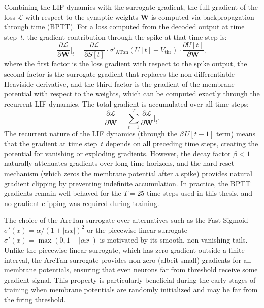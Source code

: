 Combining the LIF dynamics with the surrogate gradient, the full gradient of the loss $\mathcal{L}$ with respect to the synaptic weights $\mathbf{W}$ is computed via backpropagation through time (BPTT). For a loss computed from the decoded output at time step~$t$, the gradient contribution through the spike at that time step is:
\begin{equation}
\frac{\partial \mathcal{L}}{\partial \mathbf{W}} \bigg|_t = \frac{\partial \mathcal{L}}{\partial S[t]} \cdot \sigma'_{\text{ATan}}(U[t] - V_{\text{thr}}) \cdot \frac{\partial U[t]}{\partial \mathbf{W}},
\label{eq:bptt-gradient}
\end{equation}
where the first factor is the loss gradient with respect to the spike output, the second factor is the surrogate gradient that replaces the non-differentiable Heaviside derivative, and the third factor is the gradient of the membrane potential with respect to the weights, which can be computed exactly through the recurrent LIF dynamics. The total gradient is accumulated over all time steps:
\begin{equation}
\frac{\partial \mathcal{L}}{\partial \mathbf{W}} = \sum_{t=1}^{T} \frac{\partial \mathcal{L}}{\partial \mathbf{W}} \bigg|_t.
\label{eq:bptt-total}
\end{equation}
The recurrent nature of the LIF dynamics (through the $\beta \, U[t-1]$ term) means that the gradient at time step~$t$ depends on all preceding time steps, creating the potential for vanishing or exploding gradients. However, the decay factor $\beta < 1$ naturally attenuates gradients over long time horizons, and the hard reset mechanism (which zeros the membrane potential after a spike) provides natural gradient clipping by preventing indefinite accumulation. In practice, the BPTT gradients remain well-behaved for the $T = 25$ time steps used in this thesis, and no gradient clipping was required during training.

The choice of the ArcTan surrogate over alternatives such as the Fast Sigmoid $\sigma'(x) = \alpha / (1 + |\alpha x|)^2$ or the piecewise linear surrogate $\sigma'(x) = \max(0, 1 - |\alpha x|)$ is motivated by its smooth, non-vanishing tails. Unlike the piecewise linear surrogate, which has zero gradient outside a finite interval, the ArcTan surrogate provides non-zero (albeit small) gradients for all membrane potentials, ensuring that even neurons far from threshold receive some gradient signal. This property is particularly beneficial during the early stages of training when membrane potentials are randomly initialized and may be far from the firing threshold.
